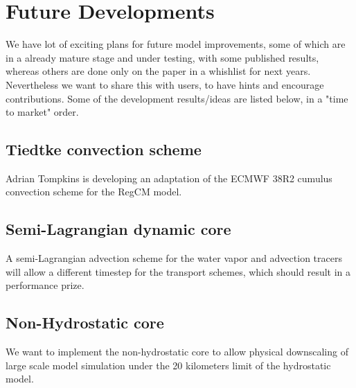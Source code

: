 
\chapter{Future Developments}

We have lot of exciting plans for future model improvements, some of which
are in a already mature stage and under testing, with some published results,
whereas others are done only on the paper in a whishlist for next years.
Nevertheless we want to share this with users, to have hints and encourage
contributions.
Some of the development results/ideas are listed below, in a "time to market"
order.

\section{Tiedtke convection scheme}

Adrian Tompkins is developing an adaptation of the ECMWF 38R2 \cite{Tiedtke_89}
cumulus convection scheme for the \ac{RegCM} model.

\section{Semi-Lagrangian dynamic core}

A semi-Lagrangian advection scheme for the water vapor and advection tracers
will allow a different timestep for the transport schemes, which should result
in a performance prize.

\section{Non-Hydrostatic core}

We want to implement the non-hydrostatic core to allow physical downscaling
of large scale model simulation under the 20 kilometers limit of the
hydrostatic model.
